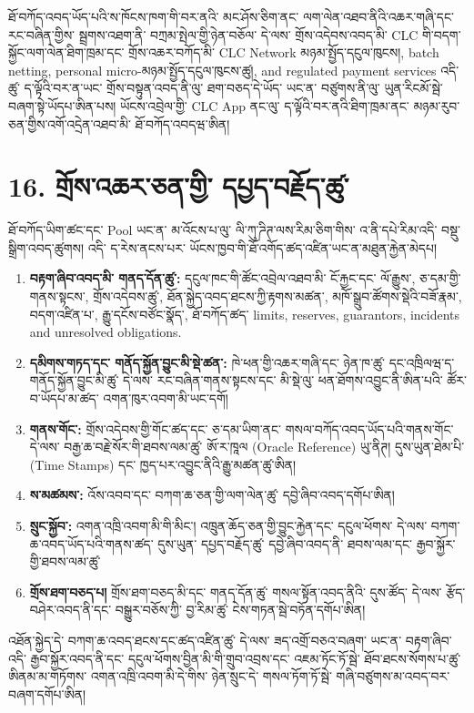 \documentclass[11pt]{article}
\begin{document}
ཐོ་བཀོད་འབད་ཡོད་པའི་ས་ཁོངས་ཁག་གི་བར་ནའི་ མང་ཤོས་ཅིག་ནང་ ལག་ལེན་འཐབ་ནིའི་འཆར་གཞི་དང་ རང་བཞིན་གྱིས་ སྦྲགས་འཐག་ནི་ བཀྲམ་སྤེལ་གྱི་ཉེན་བཅོལ་ དེ་ལས་ གྲོས་འདེབས་འབད་མི་ CLC གི་བདག་སྐྱོང་ལག་ལེན་ཐིག་ཁྲམ་དང་ གྲོས་འཆར་བཀོད་མི་ CLC Network མཉམ་སྤྱོད་དངུལ་ཁུངས།, batch netting, personal micro-མཉམ་སྤྱོད་དངུལ་ཁུངས་ཚུ།, and regulated payment services འདི་ཚུ་ ད་ལྟོའི་བར་ན་ཡང་ གྲོས་བསྟུན་འབད་ནི་ལུ་ ཐག་བཅད་དེ་ཡོད་ ཡང་ན་ བཙུགས་ནི་ལུ་ ཡུན་རིངམོ་སྦེ་ བཞག་སྟེ་ཡོདཔ་ཨིན་པས། ཡོངས་འབྲེལ་གྱི་ CLC App ནང་ལུ་ ད་ལྟོའི་བར་ནའི་ཐིག་ཁྲམ་ནང་ མཉམ་རུབ་ཅན་གྱིས་འགོ་འདྲེན་འཐབ་མི་ ཐོ་བཀོད་འབདཝ་ཨིན།


\section*{16. གྲོས་འཆར་ཅན་གྱི་ དཔྱད་བརྗོད་ཚུ་}

ཐོ་བཀོད་ཡིག་ཚང་དང་ Pool ཡང་ན་ མ་འོངས་པ་ལུ་ ལི་ཀུ་ཌིཊ་ལས་རིམ་ཅིག་གིས་ འ་ནི་དཔེ་རིམ་འདི་ བསྡུ་སྒྲིག་འབད་ཚུགས། འདི་ ད་རེས་ནངས་པར་ ཡོངས་ཁྱབ་གི་ཐོ་འགོད་ཚད་འཛིན་ཡང་ན་མཐུན་རྐྱེན་མེདཔ།

\begin{enumerate}[leftmargin=*]
\item \textbf{བརྟག་ཞིབ་འབད་མི་ གནད་དོན་ཚུ་:} དངུལ་ཁང་གི་ཚོང་འབྲེལ་འཐབ་མི་ ངོ་རྐྱང་དང་ ལོ་རྒྱུས་, ཅ་དམ་གྱི་གནས་སྟངས་, གྲོས་འདེབས་ཚུ་, ཐོན་སྐྱེད་འབད་ཐངས་ཀྱི་རྟགས་མཚན་, མཁོ་སྒྲུབ་ཚོགས་སྡེའི་བཟོ་རྣམ་, བདག་འཛིན་པ་, རྒྱུ་དངོས་བཙོང་སྣོད་, ཐོ་བཀོད་ཚད་ limits, reserves, guarantors, incidents and unresolved obligations.
\item \textbf{དམིགས་གཏད་དང་ གནོད་སྐྱོན་བྱུང་མི་སྡེ་ཚན་:} ཁེ་ཕན་གྱི་འཆར་གཞི་དང་ ཉེན་ཁ་ཚུ་ དང་འཁྲིལཝ་ད་ གནོད་སྐྱོན་བྱུང་མི་ཚུ་ དེ་ལས་ རང་བཞིན་གནས་སྟངས་དང་ མི་སྡེ་ལུ་ ཕན་ཐོགས་འབྱུང་ནི་ཨིན་པའི་ ཚོར་བ་ཡོདཔ་མ་ཚད་ འགན་ཁུར་འབག་མི་ཡང་དགོ།
\item \textbf{གནས་གོང་:} གྲོས་འདེབས་གྱི་གོང་ཚད་དང་ ཅ་དམ་ཡིག་ནང་ གསལ་བཀོད་འབད་ཡོད་པའི་གནས་གོང་ དེ་ལས་ བརྒྱ་ཆ་བརྗེ་སོར་གི་ཐབས་ལམ་ཚུ་ ཨོ་ར་ཁཱལ (Oracle Reference) ཡུ་ནིཊ། དུས་ཡུན་ཐེམ་པི་ (Time Stamps) དང་ ཁྱད་པར་འབྱུང་ནིའི་རྒྱུ་མཚན་ཚུ་ཨིན།
\item \textbf{ས་མཚམས་:} འོས་འབབ་དང་ བཀག་ཆ་ཅན་གྱི་ལག་ལེན་ཚུ་ དབྱེ་ཞིབ་འབད་དགོཔ་ཨིན།
\item \textbf{སྲུང་སྐྱོབ་:} འགན་འཁྲི་འབག་མི་གི་མིང་། འཁྲུན་ཆོད་ཅན་གྱི་བྱུང་རྐྱེན་དང་ དངུལ་ཕོགས་ དེ་ལས་ བཀག་ཆ་འབད་ཡོད་པའི་གནས་ཚད་ དུས་ཡུན་ དཔྱད་བརྗོད་ཚུ་ དབྱེ་ཞིབ་འབད་ནི་ ཐབས་ལམ་དང་ རྒྱབ་སྐྱོར་གྱི་ཐབས་ལམ་ཚུ་
\item \textbf{གྲོས་ཐག་བཅད་པ།} གྲོས་ཐག་བཅད་མི་དང་ གནད་དོན་ཚུ་ གསལ་སྟོན་འབད་ནིའི་ དུས་ཚོད་ དེ་ལས་ རྩོད་བཤེར་འབད་ནི་དང་ བསྒྱུར་བཅོས་ཀྱི་ བྱ་རིམ་ཚུ་ ངེས་གཏན་སྦེ་བཏོན་དགོཔ་ཨིན།
\end{enumerate}
འཐོན་སྐྱེད་དེ་ བཀག་ཆ་འབད་ཐངས་དང་ཚད་འཛིན་ཚུ་ དེ་ལས་ ཟད་འགྲོ་བཅའ་བཞག་ ཡང་ན་ བརྟག་ཞིབ་འདི་ རྒྱབ་སྐྱོར་འབད་ནི་དང་ དངུལ་ཕོགས་བྱིན་མི་གི་གྲུབ་འབྲས་དང་ འཇམ་ཏོང་ཏོ་སྦེ་ ཐོབ་ཐངས་སོགས་པ་ཚུ་ཨིནམ་མ་གཏོགས་ འགན་འཁྲི་འབག་མི་དེ་གིས་ ཉེན་སྲུང་དེ་ གསལ་ཏོག་ཏོ་སྦེ་ གཞི་བཙུགས་མ་འབད་བར་ བཞག་དགོཔ་ཨིན།
\end{document}

